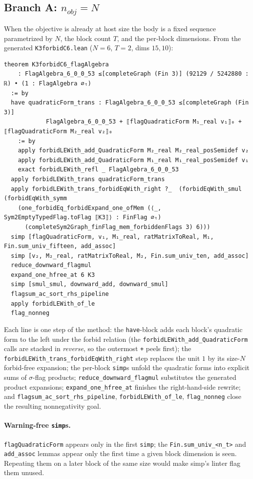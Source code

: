 \documentclass[11pt]{article}
\begin{document}
\subsection{Branch A: $n_{\mathit{obj}} = N$}

When the objective is already at host size the body is a fixed sequence
parametrized by $N$, the block count $T$, and the per-block dimensions. From the
generated \texttt{K3forbidC6.lean} ($N=6$, $T=2$, dims $15,10$):
\begin{lstlisting}
theorem K3forbidC6_flagAlgebra
    : FlagAlgebra_6_0_0_53 ≤[completeGraph (Fin 3)] (92129 / 5242880 : ℝ) • (1 : FlagAlgebra ∅ₜ)
  := by
  have quadraticForm_trans : FlagAlgebra_6_0_0_53 ≤[completeGraph (Fin 3)]
            FlagAlgebra_6_0_0_53 + ⟦flagQuadraticForm M₁_real v₁⟧₀ + ⟦flagQuadraticForm M₂_real v₂⟧₀
    := by
    apply forbidLEWith_add_QuadraticForm M₂_real M₂_real_posSemidef v₂
    apply forbidLEWith_add_QuadraticForm M₁_real M₁_real_posSemidef v₁
    exact forbidLEWith_refl _ FlagAlgebra_6_0_0_53
  apply forbidLEWith_trans quadraticForm_trans
  apply forbidLEWith_trans_forbidEqWith_right ?_  (forbidEqWith_smul (forbidEqWith_symm
    (one_forbidEq_forbidExpand_one_ofMem (⟨_, Sym2EmptyTypedFlag.toFlag ⟦K3⟧⟩ : FinFlag ∅ₜ)
      (completeSym2Graph_finFlag_mem_forbiddenFlags 3) 6)))
  simp [flagQuadraticForm, v₁, M₁_real, ratMatrixToReal, M₁, Fin.sum_univ_fifteen, add_assoc]
  simp [v₂, M₂_real, ratMatrixToReal, M₂, Fin.sum_univ_ten, add_assoc]
  reduce_downward_flagmul
  expand_one_hfree_at 6 K3
  simp [smul_smul, downward_add, downward_smul]
  flagsum_ac_sort_rhs_pipeline
  apply forbidLEWith_of_le
  flag_nonneg
\end{lstlisting}
Each line is one step of the method: the \texttt{have}-block adds each block's
quadratic form to the left under the forbid relation (the
\texttt{forbidLEWith\_add\_QuadraticForm} calls are stacked in \emph{reverse}, so
the outermost \texttt{+} peels first); the
\texttt{forbidLEWith\_trans\_forbidEqWith\_right} step replaces the unit $1$ by
its size-$N$ forbid-free expansion; the per-block \texttt{simp}s unfold the
quadratic forms into explicit sums of $\sigma$-flag products;
\texttt{reduce\_downward\_flagmul} substitutes the generated product expansions;
\texttt{expand\_one\_hfree\_at} finishes the right-hand-side rewrite; and
\texttt{flagsum\_ac\_sort\_rhs\_pipeline}, \texttt{forbidLEWith\_of\_le},
\texttt{flag\_nonneg} close the resulting nonnegativity goal.

\paragraph{Warning-free \texttt{simp}s.}
\texttt{flagQuadraticForm} appears only in the first \texttt{simp}; the
\texttt{Fin.sum\_univ\_<n\_t>} and \texttt{add\_assoc} lemmas appear only the
first time a given block dimension is seen. Repeating them on a later block of
the same size would make simp's linter flag them unused.
\end{document}
